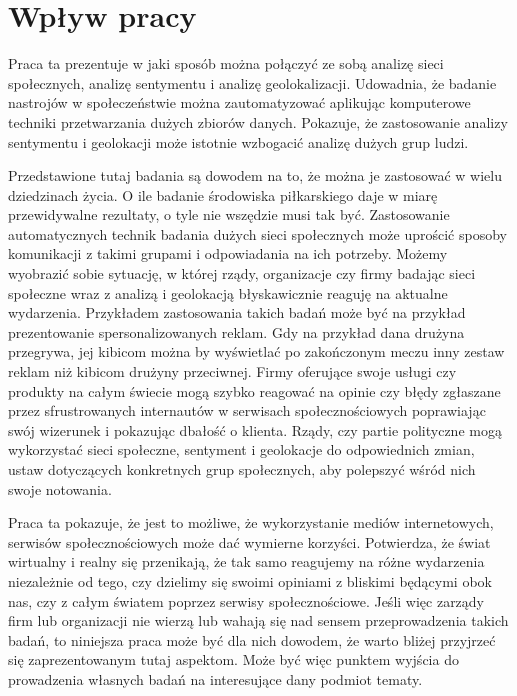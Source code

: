 \section{Wpływ pracy}
Praca ta prezentuje w jaki sposób można połączyć ze sobą analizę sieci społecznych,
analizę sentymentu i analizę geolokalizacji. Udowadnia, że badanie nastrojów
w społeczeństwie można zautomatyzować aplikując komputerowe techniki przetwarzania
dużych zbiorów danych. Pokazuje, że zastosowanie analizy sentymentu i geolokacji
może istotnie wzbogacić analizę dużych grup ludzi.

Przedstawione tutaj badania są dowodem na to, że można je zastosować w wielu
dziedzinach życia. O ile badanie środowiska piłkarskiego daje w miarę
przewidywalne rezultaty, o tyle nie wszędzie musi tak być.
Zastosowanie automatycznych technik badania dużych sieci społecznych
może uprościć sposoby komunikacji z takimi grupami i odpowiadania na ich potrzeby.
Możemy wyobrazić sobie sytuację, w której rządy, organizacje czy firmy badając
sieci społeczne wraz z analizą i geolokacją błyskawicznie reaguję na aktualne
wydarzenia. Przykładem zastosowania takich badań może być na przykład prezentowanie
spersonalizowanych reklam. Gdy na przykład dana drużyna przegrywa, jej kibicom
można by wyświetlać po zakończonym meczu inny zestaw reklam niż kibicom drużyny 
przeciwnej. Firmy oferujące swoje usługi czy produkty na całym świecie
mogą szybko reagować na opinie czy błędy zgłaszane przez sfrustrowanych internautów
w serwisach społecznościowych poprawiając swój wizerunek i pokazując dbałość
o klienta. Rządy, czy partie polityczne mogą wykorzystać sieci społeczne,
sentyment i geolokacje do odpowiednich zmian, ustaw dotyczących konkretnych grup
społecznych, aby polepszyć wśród nich swoje notowania.

Praca ta pokazuje, że jest to możliwe, że wykorzystanie mediów internetowych,
serwisów społecznościowych może dać wymierne korzyści. Potwierdza, że
świat wirtualny i realny się przenikają, że tak samo reagujemy na różne wydarzenia
niezależnie od tego, czy dzielimy się swoimi opiniami z bliskimi będącymi obok
nas, czy z całym światem poprzez serwisy społecznościowe. Jeśli więc zarządy
firm lub organizacji nie wierzą lub wahają się nad sensem przeprowadzenia
takich badań, to niniejsza praca może być dla nich dowodem, że warto bliżej
przyjrzeć się zaprezentowanym tutaj aspektom. Może być więc punktem wyjścia
do prowadzenia własnych badań na interesujące dany podmiot tematy.



